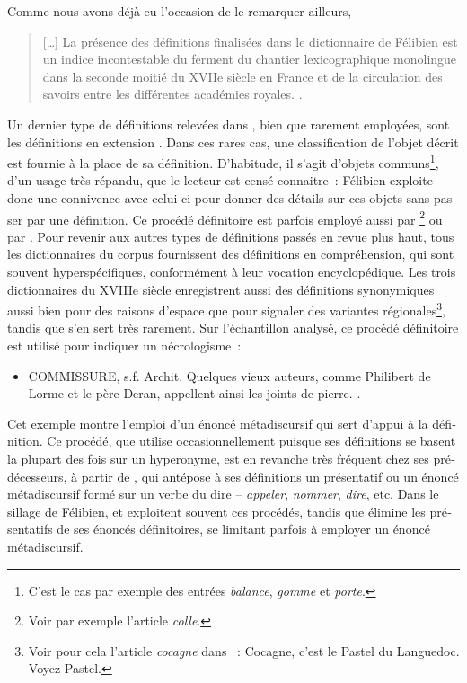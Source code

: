 \documentclass[output=paper,colorlinks,citecolor=brown,arabicfont,chinesefont,booklanguage=french]{langscibook}
\begin{document}
\begin{otherlanguage}{french}
Comme nous avons déjà eu l’occasion de le remarquer ailleurs, 

\begin{quote}
    […] La présence des définitions finalisées dans le dictionnaire de Félibien est un indice incontestable du ferment du chantier lexicographique monolingue dans la seconde moitié du XVIIe siècle en France et de la circulation des savoirs entre les différentes académies royales. \citep[162]{Cetro2022}.
\end{quote}

Un dernier type de définitions relevées dans \citet{Felibien1676}, bien que rarement employées, sont les définitions en extension \citep{Bejoint1993}. Dans ces rares cas, une classification de l’objet décrit est fournie à la place de sa définition. D’habitude, il s’agit d’objets communs\footnote{C’est le cas par exemple des entrées \emph{balance}, \emph{gomme} et \emph{porte}.}, d’un usage très répandu, que le lecteur est censé connaitre~: Félibien exploite donc une connivence avec celui-ci pour donner des détails sur ces objets sans passer par une définition. Ce procédé définitoire est parfois employé aussi par \citealt{Marsy1746}\footnote{Voir par exemple l’article \emph{colle}.}  ou par \citealt{Pernety1757}. Pour revenir aux autres types de définitions passés en revue plus haut, tous les dictionnaires du corpus fournissent des définitions en compréhension, qui sont souvent hyperspécifiques, conformément à leur vocation encyclopédique. Les trois dictionnaires du XVIIIe siècle enregistrent aussi des définitions synonymiques aussi bien pour des raisons d’espace que pour signaler des variantes régionales\footnote{Voir pour cela l’article \emph{cocagne} dans \citet[131]{Marsy1746}~: Cocagne, c’est le Pastel du Languedoc. Voyez Pastel.}, tandis que \citet{Boutard1826} s’en sert très rarement. Sur l’échantillon analysé, ce procédé définitoire est utilisé pour indiquer un nécrologisme~:

\begin{itemize}
    \item COMMISSURE, s.f. Archit. Quelques vieux auteurs, comme Philibert de Lorme et le père Deran, appellent ainsi les joints de pierre. \citep[167]{Boutard1826}.
\end{itemize}

Cet exemple montre l’emploi d’un énoncé métadiscursif qui sert d’appui à la définition. Ce procédé, que \citealt{Boutard1826} utilise occasionnellement puisque ses définitions se basent la plupart des fois sur un hyperonyme, est en revanche très fréquent chez ses prédécesseurs, à partir de \citet{Felibien1676}, qui antépose à ses définitions un présentatif ou un énoncé métadiscursif formé sur un verbe du dire – \emph{appeler}, \emph{nommer}, \emph{dire}, etc. Dans le sillage de Félibien, \citet{Marsy1746} et \citet{Lacombe1752} exploitent souvent ces procédés, tandis que \citet{Pernety1757} élimine les présentatifs de ses énoncés définitoires, se limitant parfois à employer un énoncé métadiscursif.


\end{otherlanguage}
\end{document}
